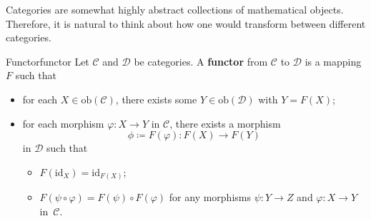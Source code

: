 \documentclass[math]{amznotes}
\theoremstyle{remark}
\newcommand{\0}{\mathbf{0}}
\newcommand{\1}{\mathbf{1}}
\begin{document}
Categories are somewhat highly abstract collections of mathematical objects. Therefore, it is natural to think about how one would transform between different categories.
\begin{dfnbox}{Functor}{functor}
    Let $\mathcal{C}$ and $\mathcal{D}$ be categories. A {\color{red} \textbf{functor}} from $\mathcal{C}$ to $\mathcal{D}$ is a mapping $F$ such that 
    \begin{itemize}
        \item for each $X \in \mathrm{ob}\left(\mathcal{C}\right)$, there exists some $Y \in \mathrm{ob}\left(\mathcal{D}\right)$ with $Y = F\left(X\right)$;
        \item for each morphism $\varphi \colon X \to Y$ in $\mathcal{C}$, there exists a morphism 
        \begin{equation*}
            \phi \coloneqq F\left(\varphi\right) \colon F\left(X\right) \to F\left(Y\right)
        \end{equation*}
        in $\mathcal{D}$ such that 
        \begin{itemize}
            \item $F\left(\mathrm{id}_X\right) = \mathrm{id}_{F\left(X\right)}$;
            \item $F\left(\psi \circ \varphi\right) = F\left(\psi\right) \circ F\left(\varphi\right)$ for any morphisms $\psi \colon Y \to Z$ and $\varphi \colon X \to Y$ in~$\mathcal{C}$.
        \end{itemize}
    \end{itemize}
\end{dfnbox}
\end{document}
